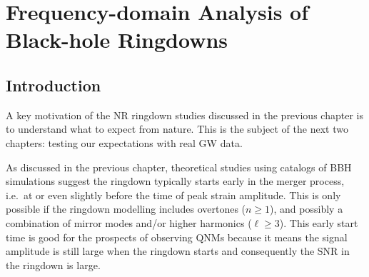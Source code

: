 
\chapter{Frequency-domain Analysis of Black-hole Ringdowns}

\label{Chapter3}

\section{Introduction}\label{ch3:sec:introduction}

A key motivation of the NR ringdown studies discussed in the previous chapter is to understand what to expect from nature. 
This is the subject of the next two chapters: testing our expectations with real GW data.

As discussed in the previous chapter, theoretical studies using catalogs of BBH simulations suggest the ringdown typically starts early in the merger process, i.e.\ at or even slightly before the time of peak strain amplitude. 
This is only possible if the ringdown modelling includes overtones ($n \geq 1$), and possibly a combination of mirror modes and/or higher harmonics ($\ell \geq 3$).
This early start time is good for the prospects of observing QNMs because it means the signal amplitude is still large when the ringdown starts and consequently the SNR in the ringdown is large.

